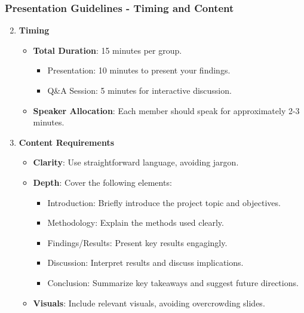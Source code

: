 \documentclass[aspectratio=169]{beamer}
\begin{document}
\begin{frame}[fragile]
    \frametitle{Presentation Guidelines - Timing and Content}
    \begin{enumerate}
        \setcounter{enumi}{1}
        \item \textbf{Timing}
        \begin{itemize}
            \item \textbf{Total Duration}: 15 minutes per group.
            \begin{itemize}
                \item Presentation: 10 minutes to present your findings.
                \item Q\&A Session: 5 minutes for interactive discussion.
            \end{itemize}
            \item \textbf{Speaker Allocation}: Each member should speak for approximately 2-3 minutes.
        \end{itemize}
        
        \item  \textbf{Content Requirements}
        \begin{itemize}
            \item \textbf{Clarity}: Use straightforward language, avoiding jargon.
            \item \textbf{Depth}: Cover the following elements:
            \begin{itemize}
                \item Introduction: Briefly introduce the project topic and objectives.
                \item Methodology: Explain the methods used clearly.
                \item Findings/Results: Present key results engagingly.
                \item Discussion: Interpret results and discuss implications.
                \item Conclusion: Summarize key takeaways and suggest future directions.
            \end{itemize}
            \item \textbf{Visuals}: Include relevant visuals, avoiding overcrowding slides.
        \end{itemize}
    \end{enumerate}
\end{frame}
\end{document}
